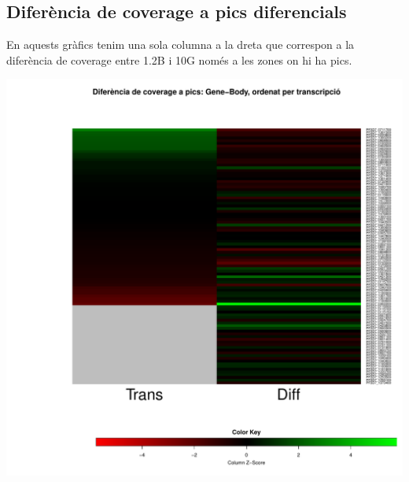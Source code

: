 \documentclass{article}\usepackage[]{graphicx}\usepackage[]{color}
\newenvironment{knitrout}{}{} %
\begin{document}
\subsection{Diferència de coverage a pics diferencials}
En aquests gràfics tenim una sola columna a la dreta que correspon a la diferència de coverage entre 1.2B i 10G només a les zones on hi ha pics.
\begin{knitrout}
\color{fgcolor}

{\centering \includegraphics[width=.9\linewidth]{figure/minimal-heat_difpeak_cov_dif-1} 

}



\end{knitrout}
\clearpage
\end{document}
